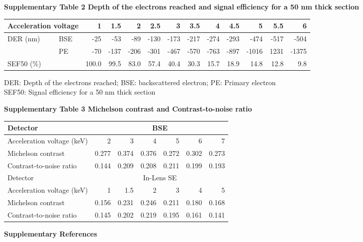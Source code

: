\documentclass{article}
\begin{document}
\noindent\textbf{Supplementary Table 2 \quad Depth of the electrons reached and signal efficiency for a 50 nm thick section}

{\footnotesize\setlength{\tabcolsep}{3pt}
\begin{tabular}{llrrrrrrrrrrr}
\toprule
\multicolumn{2}{l}{Acceleration voltage} & 1 & 1.5 & 2 & 2.5 & 3 & 3.5 & 4 & 4.5 & 5 & 5.5 & 6 \\ \midrule
DER (nm) & BSE & -25 & -53 & -89 & -130 & -173 & -217 & -274 & -293 & -474 & -517 & -504 \\
 & PE & -70 & -137 & -206 & -301 & -467 & -570 & -763 & -897 & -1016 & 1231 & -1375 \\
\multicolumn{2}{l}{SEF50 (\%)} & 100.0 & 99.5 & 83.0 & 57.4 & 40.4 & 30.3 & 15.7 & 18.9 & 14.8 & 12.8 & 9.8 \\ \bottomrule
\end{tabular}}

\noindent DER: Depth of the electrons reached; BSE: backscattered electron; PE: Primary electron\\
SEF50: Signal efficiency for a 50 nm thick section

\noindent\textbf{Supplementary Table 3 \quad Michelson contrast and Contrast-to-noise ratio}

{\footnotesize
\begin{tabular}{lrrrrrr}
\toprule
Detector & \multicolumn{6}{c}{BSE} \\ \midrule
Acceleration voltage (keV) & 2 & 3 & 4 & 5 & 6 & 7 \\
Michelson contrast & 0.277 & 0.374 & 0.376 & 0.272 & 0.302 & 0.273 \\
Contrast-to-noise ratio & 0.144 & 0.209 & 0.208 & 0.211 & 0.199 & 0.193 \\ \midrule
Detector & \multicolumn{6}{c}{In-Lens SE} \\ \midrule
Acceleration voltage (keV) & 1 & 1.5 & 2 & 3 & 4 & 5 \\
Michelson contrast & 0.156 & 0.231 & 0.246 & 0.211 & 0.180 & 0.168 \\
Contrast-to-noise ratio & 0.145 & 0.202 & 0.219 & 0.195 & 0.161 & 0.141 \\ \bottomrule
\end{tabular}}


\noindent\textbf{Supplementary References}
\end{document}
